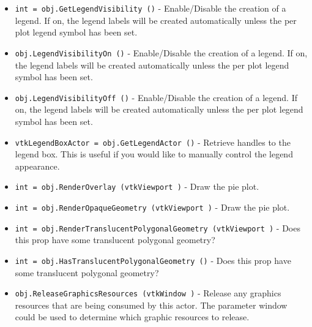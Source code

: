 \begin{itemize}
\item  \verb|int = obj.GetLegendVisibility ()| -  Enable/Disable the creation of a legend. If on, the legend labels will
 be created automatically unless the per plot legend symbol has been
 set.

\item  \verb|obj.LegendVisibilityOn ()| -  Enable/Disable the creation of a legend. If on, the legend labels will
 be created automatically unless the per plot legend symbol has been
 set.

\item  \verb|obj.LegendVisibilityOff ()| -  Enable/Disable the creation of a legend. If on, the legend labels will
 be created automatically unless the per plot legend symbol has been
 set.

\item  \verb|vtkLegendBoxActor = obj.GetLegendActor ()| -  Retrieve handles to the legend box. This is useful if you would like 
 to manually control the legend appearance.

\item  \verb|int = obj.RenderOverlay (vtkViewport )| -  Draw the pie plot.

\item  \verb|int = obj.RenderOpaqueGeometry (vtkViewport )| -  Draw the pie plot.

\item  \verb|int = obj.RenderTranslucentPolygonalGeometry (vtkViewport )| -  Does this prop have some translucent polygonal geometry?

\item  \verb|int = obj.HasTranslucentPolygonalGeometry ()| -  Does this prop have some translucent polygonal geometry?

\item  \verb|obj.ReleaseGraphicsResources (vtkWindow )| -  Release any graphics resources that are being consumed by this actor.
 The parameter window could be used to determine which graphic
 resources to release.

\end{itemize}

